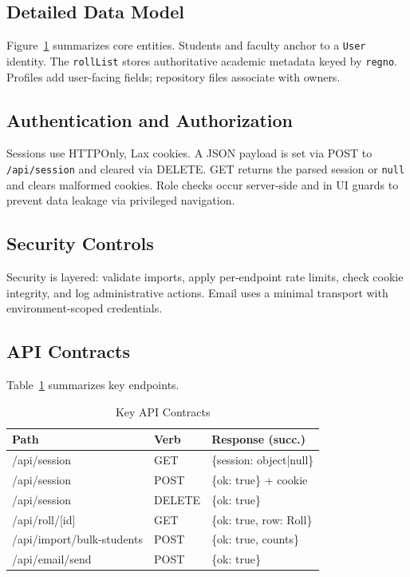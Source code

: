 \documentclass[conference]{IEEEtran}
\begin{document}
\subsection{Detailed Data Model}
Figure~\ref{fig:er} summarizes core entities. Students and faculty anchor to a \texttt{User} identity. The \texttt{rollList} stores authoritative academic metadata keyed by \texttt{regno}. Profiles add user-facing fields; repository files associate with owners.

\begin{figure}[t]
  \centering

 
  \label{fig:er}
\end{figure}

\subsection{Authentication and Authorization}
Sessions use HTTPOnly, Lax cookies. A JSON payload is set via POST to \texttt{/api/session} and cleared via DELETE. GET returns the parsed session or \texttt{null} and clears malformed cookies. Role checks occur server-side and in UI guards to prevent data leakage via privileged navigation.

\subsection{Security Controls}
Security is layered: validate imports, apply per-endpoint rate limits, check cookie integrity, and log administrative actions. Email uses a minimal transport with environment-scoped credentials.

\subsection{API Contracts}
Table~\ref{tab:api} summarizes key endpoints.
\begin{table}[t]
\centering
\caption{Key API Contracts}
\label{tab:api}
\begin{tabular}{p{3.2cm}p{1.0cm}p{3.2cm}}
\toprule
\textbf{Path} & \textbf{Verb} & \textbf{Response (succ.)} \\
\midrule
/api/session & GET & \{session: object|null\} \\
/api/session & POST & \{ok: true\} + cookie \\
/api/session & DELETE & \{ok: true\} \\
/api/roll/[id] & GET & \{ok: true, row: Roll\} \\
/api/import/bulk-students & POST & \{ok: true, counts\} \\
/api/email/send & POST & \{ok: true\} \\
\bottomrule
\end{tabular}
\end{table}
\end{document}
